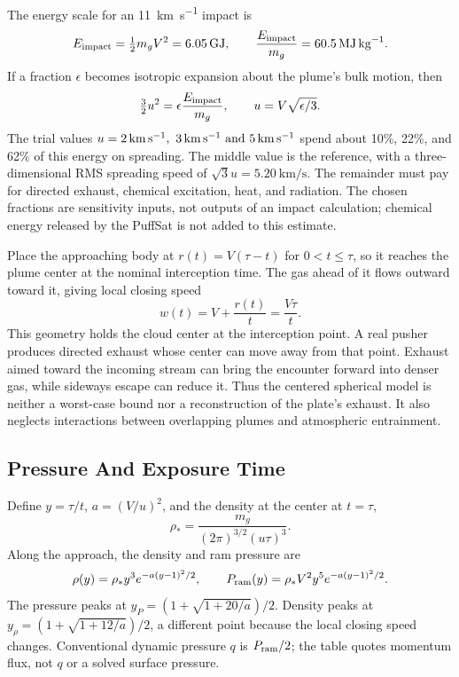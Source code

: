 \documentclass{article}
\begin{document}
The energy scale for an \SI{11}{\kilo\meter\per\second} impact is
\begin{equation}
E_{\rm impact}=\tfrac12m_gV^2=\SI{6.05}{\giga\joule},
\qquad
\frac{E_{\rm impact}}{m_g}=\SI{60.5}{\mega\joule\per\kilogram}.
\end{equation}
If a fraction $\epsilon$ becomes isotropic expansion about the plume's bulk motion, then
\begin{equation}\label{eq:leo_plume_spread}
\tfrac32u^2=\epsilon\frac{E_{\rm impact}}{m_g},
\qquad
u=V\sqrt{\epsilon/3}.
\end{equation}
The trial values $u=\SIlist{2;3;5}{\kilo\meter\per\second}$ spend about 10\%, 22\%, and 62\% of this energy on spreading. The middle value is the reference, with a three-dimensional RMS spreading speed of $\sqrt{3}u=\SI{5.20}{\kilo\meter\per\second}$. The remainder must pay for directed exhaust, chemical excitation, heat, and radiation. The chosen fractions are sensitivity inputs, not outputs of an impact calculation; chemical energy released by the PuffSat is not added to this estimate.

Place the approaching body at $r(t)=V(\tau-t)$ for $0<t\leq\tau$, so it reaches the plume center at the nominal interception time. The gas ahead of it flows outward toward it, giving local closing speed
\begin{equation}\label{eq:leo_plume_closing}
w(t)=V+\frac{r(t)}{t}=\frac{V\tau}{t}.
\end{equation}
This geometry holds the cloud center at the interception point. A real pusher produces directed exhaust whose center can move away from that point. Exhaust aimed toward the incoming stream can bring the encounter forward into denser gas, while sideways escape can reduce it. Thus the centered spherical model is neither a worst-case bound nor a reconstruction of the plate's exhaust. It also neglects interactions between overlapping plumes and atmospheric entrainment.

\subsection{Pressure And Exposure Time}
Define $y=\tau/t$, $a=(V/u)^2$, and the density at the center at $t=\tau$,
\begin{equation}
\rho_* = \frac{m_g}{(2\pi)^{3/2}(u\tau)^3}.
\end{equation}
Along the approach, the density and ram pressure are
\begin{equation}\label{eq:leo_plume_ram}
\rho(y)=\rho_*y^3e^{-a(y-1)^2/2},
\qquad
P_{\rm ram}(y)=\rho_*V^2y^5e^{-a(y-1)^2/2}.
\end{equation}
The pressure peaks at $y_P=(1+\sqrt{1+20/a})/2$. Density peaks at $y_\rho=(1+\sqrt{1+12/a})/2$, a different point because the local closing speed changes. Conventional dynamic pressure $q$ is $P_{\rm ram}/2$; the table quotes momentum flux, not $q$ or a solved surface pressure.
\end{document}
